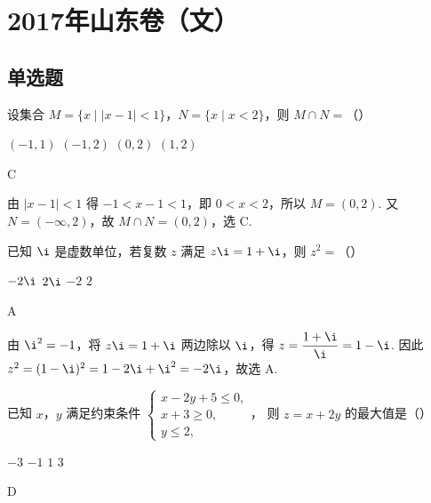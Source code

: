 \chapter{2017年山东卷（文）}

\section{单选题}

\begin{problem}
设集合 \(M=\{x\mid \lvert x-1\rvert<1\}\)，\(N=\{x\mid x<2\}\)，则 \(M\cap N=\)（\quad）

\choices
    {\(\left(-1,1\right)\)}
    {\(\left(-1,2\right)\)}
    {\(\left(0,2\right)\)}
    {\(\left(1,2\right)\)}
\end{problem}

\begin{answer}
C
\end{answer}

\begin{solution}
由 \(\lvert x-1\rvert<1\) 得 \(-1<x-1<1\)，即 \(0<x<2\)，所以 \(M=(0,2)\). 又 \(N=(-\infty,2)\)，故 \(M\cap N=(0,2)\)，选 C.
\end{solution}

\begin{problem}
已知 \(\i\) 是虚数单位，若复数 \(z\) 满足 \(z\i=1+\i\)，则 \(z^2=\)（\quad）

\choices
    {\(-2\i\)}
    {\(2\i\)}
    {\(-2\)}
    {\(2\)}
\end{problem}

\begin{answer}
A
\end{answer}

\begin{solution}
由 \(\i^2=-1\)，将 \(z\i=1+\i\) 两边除以 \(\i\)，得 \(z=\dfrac{1+\i}{\i}=1-\i\). 因此
\(z^2=(1-\i)^2=1-2\i+\i^2=-2\i\)，故选 A.
\end{solution}

\begin{problem}
已知 \(x\)，\(y\) 满足约束条件
\(\begin{cases}
x-2y+5\le0,\\
x+3\ge0,\\
y\le2,
\end{cases}\)，
则 \(z=x+2y\) 的最大值是（\quad）

\choices
    {\(-3\)}
    {\(-1\)}
    {\(1\)}
    {\(3\)}
\end{problem}

\begin{answer}
D
\end{answer}

